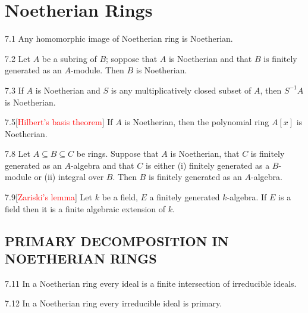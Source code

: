 \chapter{Noetherian Rings}

\begin{proposition}{7.1}
	Any homomorphic image of Noetherian ring is Noetherian.
\end{proposition}

\begin{proposition}{7.2}
	Let $A$ be a subring of $B$; soppose that $A$ is Noetherian and that $B$ is finitely generated as an $A$-module. Then $B$ is Noetherian.
\end{proposition}

\begin{proposition}{7.3}
	If $A$ is Noetherian and $S$ is any multiplicatively closed subset of $A$, then $S^{-1}A$ is Noetherian.
\end{proposition}

\begin{theorem}{7.5}[\textcolor{red}{Hilbert's basis theorem}]
	If $A$ is Noetherian, then the polynomial ring $A[x]$ is Noetherian.
\end{theorem}

\begin{proposition}{7.8}
	Let $A\subseteq B\subseteq C$ be rings. Suppose that $A$ is Noetherian, that $C$ is finitely generated as an $A$-algebra and that $C$ is either (i) finitely generated as a $B$-module or (ii) integral over $B$. Then $B$ is finitely generated as an $A$-algebra.
\end{proposition}

\begin{proposition}{7.9}[\textcolor{red}{Zariski's lemma}]
	Let $k$ be a field, $E$ a finitely generated $k$-algebra. If $E$ is a field then it is a finite algebraic extension of $k$.
\end{proposition}

\section*{PRIMARY DECOMPOSITION IN NOETHERIAN RINGS}

\begin{proposition}{7.11}
	In a Noetherian ring every ideal is a finite intersection of irreducible ideals.
\end{proposition}

\begin{proposition}{7.12}
	In a Noetherian ring every irreducible ideal is primary.
\end{proposition}

